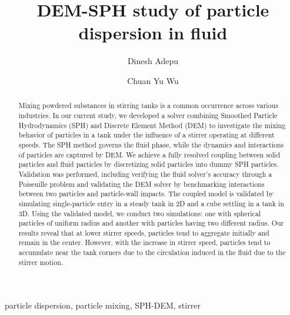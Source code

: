 \documentclass[preprint,12pt]{elsarticle}
\begin{document}
\begin{frontmatter}

  \title{{DEM}-{SPH} study of particle dispersion in fluid}
  \author[xxx]{Dinesh Adepu}
  \author[xxx]{Chuan Yu Wu}
\address[xxx]{School of Chemistry and Chemical Engineering, University of Surrey, Guildford, GU2 7XH, UK}



\begin{abstract}
  Mixing powdered substances in stirring tanks is a common occurrence across
  various industries. In our current study, we developed a solver combining
  Smoothed Particle Hydrodynamics (SPH) and Discrete Element Method (DEM) to
  investigate the mixing behavior of particles in a tank under the influence
  of a stirrer operating at different speeds.  The SPH method governs the
  fluid phase, while the dynamics and interactions of particles are captured
  by DEM. We achieve a fully resolved coupling between solid particles and
  fluid particles by discretizing solid particles into dummy SPH
  particles. Validation was performed, including verifying the fluid solver's
  accuracy through a Poiseuille problem and validating the DEM solver by
  benchmarking interactions between two particles and particle-wall impacts.
  The coupled model is validated by simulating single-particle entry in a
  steady tank in 2D and a cube settling in a tank in 3D. Using the validated
  model, we conduct two simulations: one with spherical particles of uniform
  radius and another with particles having two different radius.  Our results
  reveal that at lower stirrer speeds, particles tend to aggregate
  initially and remain in the center. However, with the increase in
  stirrer speed, particles tend to accumulate near the tank corners due to the
  circulation induced in the fluid due to the stirrer motion.
\end{abstract}

\begin{keyword}
{particle dispersion}, {particle mixing}, {SPH-DEM}, {stirrer}


\end{keyword}

\end{frontmatter}
\end{document}
